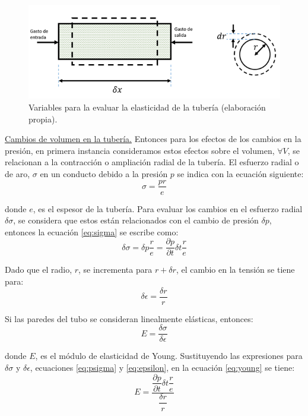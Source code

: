 \documentclass[letterpaper]{report}
\begin{document}
\begin{figure}[H]
	\centering
	\includegraphics[width=0.7\linewidth]{figuras/fig20}
	\caption{Variables para la evaluar la elasticidad de la tubería (elaboración propia).}
	\label{fig:fig20}
\end{figure}

\underline{Cambios de volumen en la tubería.}
Entonces para los efectos de los cambios en la presión, en primera instancia consideramos estos efectos sobre el volumen, $\forall V$, se relacionan 
a la contracción o ampliación radial de la tubería. El esfuerzo radial o de aro, $\sigma$ en un conducto debido a la presión $p$ se indica con la ecuación siguiente:
\begin{equation}
 \sigma= \frac{pr}{e}
\label{eq:sigma}
\end{equation}

donde $e$, es el espesor de la tubería. Para evaluar los cambios en el esfuerzo radial $\delta\sigma$, se considera que estos están relacionados con 
el cambio de presión $\delta p$, entonces la ecuación \ref{eq:sigma} se escribe como:
\begin{equation}
	\delta\sigma=\delta p\frac{r}{e}=\frac{\partial p}{\partial t}\delta t\frac{r}{e}
\label{eq:psigma}
\end{equation}

Dado que el radio, $r$, se incrementa para $r+\delta r$, el cambio en la tensión se tiene para:
\begin{equation}
	\delta\epsilon=\frac{\delta r}{r}
\label{eq:epsilon}
\end{equation}

Si las paredes del tubo se consideran linealmente elásticas, entonces:
\begin{equation}
	E=\frac{\delta\sigma}{\delta\epsilon}
\label{eq:young}
\end{equation}

donde $E$, es el módulo de elasticidad de Young. Sustituyendo las expresiones para $\delta\sigma$ y $\delta\epsilon$, ecuaciones \ref{eq:psigma} y 
\ref{eq:epsilon}, en la ecuación \ref{eq:young} se tiene:
\begin{equation*}
	E=\dfrac{\dfrac{\partial p}{\partial t} \delta t \dfrac{r}{e}}{\dfrac{\delta r}{r}}
\end{equation*}
\end{document}
